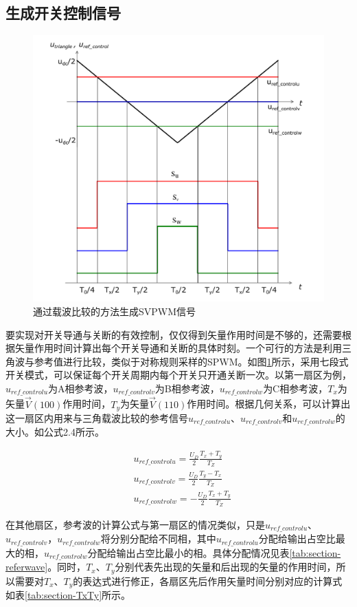 \documentclass{ctexart}
\numberwithin{equation}{section}
\begin{document}
\subsection{生成开关控制信号}
\begin{figure}[hbt]
  \centering
  \includegraphics[width = .55\linewidth ]{svpwm_modulation_wave.pdf}
  \caption{通过载波比较的方法生成SVPWM信号}
  \label{fig:svpwm-wave}
\end{figure}

要实现对开关导通与关断的有效控制，仅仅得到矢量作用时间是不够的，还需要根据矢量作用时间计算出每个开关导通和关断的具体时刻。一个可行的方法是利用三角波与参考值进行比较，类似于对称规则采样的SPWM。如图\ref{fig:svpwm-wave}所示，采用七段式开关模式，可以保证每个开关周期内每个开关只开通关断一次。以第一扇区为例，$u_{ref\_controlu}$为A相参考波，$u_{ref\_controlv}$为B相参考波，$u_{ref\_controlw}$为C相参考波，$ T_x $为矢量$ \vec V(100) $作用时间，$ T_y $为矢量$ \vec V(110) $作用时间。根据几何关系，可以计算出这一扇区内用来与三角载波比较的参考信号$u_{ref\_controlu}$、$u_{ref\_controlv}$和$u_{ref\_controlw}$的大小。如公式2.4所示。

\begin{equation}
  \begin{aligned}
  	&u_{ref\_controlu} = \frac{U_D}{2}\frac{T_x+T_y}{T_Z}\\
  	&u_{ref\_controlv} = \frac{U_D}{2}\frac{T_y-T_x}{T_Z} \\
  	&u_{ref\_controlw} = -\frac{U_D}{2}\frac{T_x+T_y}{T_Z}
  \end{aligned}
\end{equation}

在其他扇区，参考波的计算公式与第一扇区的情况类似，只是$u_{ref\_controlu}$、$u_{ref\_controlv}$，$u_{ref\_controlw}$将分别分配给不同相，其中$u_{ref\_controlu}$分配给输出占空比最大的相，$u_{ref\_controlw}$分配给输出占空比最小的相。具体分配情况见表\ref{tab:section-referwave}。同时，$ T_x $、$ T_y $分别代表先出现的矢量和后出现的矢量的作用时间，所以需要对$ T_x $、$ T_y $的表达式进行修正，各扇区先后作用矢量时间分别对应的计算式如表\ref{tab:section-TxTy}所示。
\end{document}
